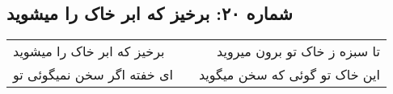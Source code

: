 \begin{center}
\section*{شماره ۲۰: برخیز که ابر خاک را میشوید}
\label{sec:020}
\begin{longtable}{l p{0.5cm} r}
برخیز که ابر خاک را میشوید
&&
تا سبزه ز خاک تو برون میروید
\\
ای خفته اگر سخن نمیگوئی تو
&&
این خاک تو گوئی که سخن میگوید
\\
\end{longtable}
\end{center}

